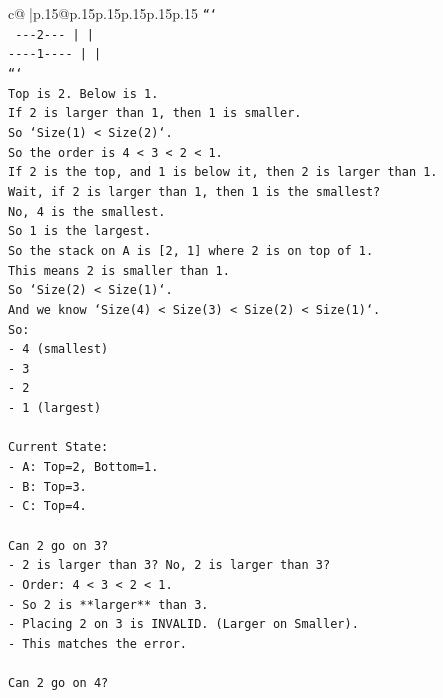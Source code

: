 \documentclass{article}
\begin{document}
{\begin{supertabular}{c@{$\;$}|p{.15\linewidth}@{}p{.15\linewidth}p{.15\linewidth}p{.15\linewidth}p{.15\linewidth}p{.15\linewidth}}
{{{\texttt{```} \\
\texttt{ {-}{-}{-}2{-}{-}{-}      |         |    } \\
\texttt{{-}{-}{-}{-}1{-}{-}{-}{-}     |         |    } \\
\texttt{```} \\
\texttt{Top is 2. Below is 1.} \\
\texttt{If 2 is larger than 1, then 1 is smaller.} \\
\texttt{So `Size(1) < Size(2)`.} \\
\texttt{So the order is 4 < 3 < 2 < 1.} \\
\texttt{If 2 is the top, and 1 is below it, then 2 is larger than 1.} \\
\texttt{Wait, if 2 is larger than 1, then 1 is the smallest?} \\
\texttt{No, 4 is the smallest.} \\
\texttt{So 1 is the largest.} \\
\texttt{So the stack on A is {[}2, 1{]} where 2 is on top of 1.} \\
\texttt{This means 2 is smaller than 1.} \\
\texttt{So `Size(2) < Size(1)`.} \\
\texttt{And we know `Size(4) < Size(3) < Size(2) < Size(1)`.} \\
\texttt{So:} \\
\texttt{{-} 4 (smallest)} \\
\texttt{{-} 3} \\
\texttt{{-} 2} \\
\texttt{{-} 1 (largest)} \\
\\ 
\texttt{Current State:} \\
\texttt{{-} A: Top=2, Bottom=1.} \\
\texttt{{-} B: Top=3.} \\
\texttt{{-} C: Top=4.} \\
\\ 
\texttt{Can 2 go on 3?} \\
\texttt{{-} 2 is larger than 3? No, 2 is larger than 3?} \\
\texttt{{-} Order: 4 < 3 < 2 < 1.} \\
\texttt{{-} So 2 is **larger** than 3.} \\
\texttt{{-} Placing 2 on 3 is INVALID. (Larger on Smaller).} \\
\texttt{{-} This matches the error.} \\
\\ 
\texttt{Can 2 go on 4?} \\
}}}
\end{supertabular}}
\end{document}
